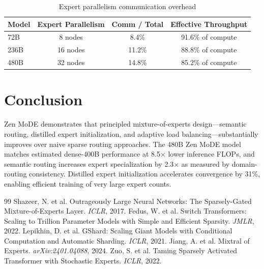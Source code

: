 \documentclass[11pt,a4paper]{article}
\begin{document}
\begin{table}[H]
\centering
\caption{Expert parallelism communication overhead}
\label{tab:comm}
\begin{tabular}{lccc}
\toprule
Model & Expert Parallelism & Comm / Total & Effective Throughput \\
\midrule
72B & 8 nodes & 8.4\% & 91.6\% of compute \\
236B & 16 nodes & 11.2\% & 88.8\% of compute \\
480B & 32 nodes & 14.8\% & 85.2\% of compute \\
\bottomrule
\end{tabular}
\end{table}

\section{Conclusion}

Zen MoDE demonstrates that principled mixture-of-experts design—semantic routing, distilled expert initialization, and adaptive load balancing—substantially improves over naive sparse routing approaches. The 480B Zen MoDE model matches estimated dense-400B performance at 8.5$\times$ lower inference FLOPs, and semantic routing increases expert specialization by 2.3$\times$ as measured by domain-routing consistency. Distilled expert initialization accelerates convergence by 31\%, enabling efficient training of very large expert counts.

\begin{thebibliography}{99}
 Shazeer, N. et al. Outrageously Large Neural Networks: The Sparsely-Gated Mixture-of-Experts Layer. \textit{ICLR}, 2017.
 Fedus, W. et al. Switch Transformers: Scaling to Trillion Parameter Models with Simple and Efficient Sparsity. \textit{JMLR}, 2022.
 Lepikhin, D. et al. GShard: Scaling Giant Models with Conditional Computation and Automatic Sharding. \textit{ICLR}, 2021.
 Jiang, A. et al. Mixtral of Experts. \textit{arXiv:2401.04088}, 2024.
 Zuo, S. et al. Taming Sparsely Activated Transformer with Stochastic Experts. \textit{ICLR}, 2022.
\end{thebibliography}
\end{document}
